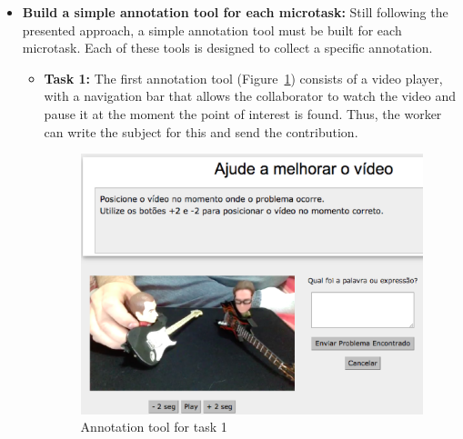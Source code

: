 \begin{itemize}
\begin{itemize}
\end{itemize}


\item \textbf{Build a simple annotation tool for each microtask:} \linebreak 
Still following the presented approach, a simple annotation tool must be built for each microtask. Each of these tools is designed to collect a specific annotation.



\begin{itemize}
\item \textbf{Task 1:} The first annotation tool (Figure~\ref{task1}) consists of a video player, with a navigation bar that allows the collaborator to watch the video and pause it at the moment the point of interest is found. Thus, the worker can write the subject for this and send the contribution.
\begin{figure}[h]
	\centerline{\includegraphics[scale=0.28] {figure/task1_c}}
	\caption{Annotation tool for task 1}
	\label{task1}
\end{figure}  


\end{itemize}
\end{itemize}
